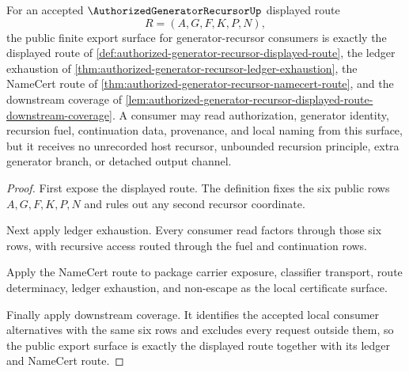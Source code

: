 \begin{theorem}
\label{thm:authorized-generator-recursor-public-route}
For an accepted $\AuthorizedGeneratorRecursorUp$ displayed route
$$
R=(A,G,F,K,P,N),
$$
the public finite export surface for generator-recursor consumers is exactly the displayed route of \autoref{def:authorized-generator-recursor-displayed-route}, the ledger exhaustion of \autoref{thm:authorized-generator-recursor-ledger-exhaustion}, the NameCert route of \autoref{thm:authorized-generator-recursor-namecert-route}, and the downstream coverage of \autoref{lem:authorized-generator-recursor-displayed-route-downstream-coverage}. A consumer may read authorization, generator identity, recursion fuel, continuation data, provenance, and local naming from this surface, but it receives no unrecorded host recursor, unbounded recursion principle, extra generator branch, or detached output channel.
\end{theorem}
\begin{proof}
First expose the displayed route. The definition fixes the six public rows $A,G,F,K,P,N$ and rules out any second recursor coordinate.

Next apply ledger exhaustion. Every consumer read factors through those six rows, with recursive access routed through the fuel and continuation rows.

Apply the NameCert route to package carrier exposure, classifier transport, route determinacy, ledger exhaustion, and non-escape as the local certificate surface.

Finally apply downstream coverage. It identifies the accepted local consumer alternatives with the same six rows and excludes every request outside them, so the public export surface is exactly the displayed route together with its ledger and NameCert route.
\end{proof}
